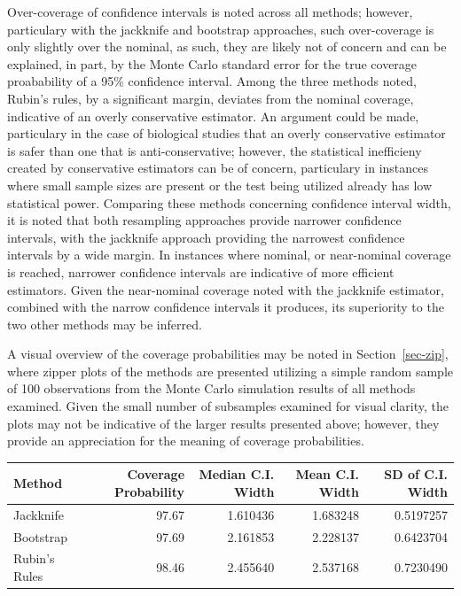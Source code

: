 \documentclass[
  letterpaper,
  DIV=11,
  numbers=noendperiod]{scrreprt}
\begin{document}
Over-coverage of confidence intervals is noted across all methods;
however, particulary with the jackknife and bootstrap approaches, such
over-coverage is only slightly over the nominal, as such, they are
likely not of concern and can be explained, in part, by the Monte Carlo
standard error for the true coverage proabability of a 95\% confidence
interval. Among the three methods noted, Rubin's rules, by a significant
margin, deviates from the nominal coverage, indicative of an overly
conservative estimator. An argument could be made, particulary in the
case of biological studies that an overly conservative estimator is
safer than one that is anti-conservative; however, the statistical
inefficieny created by conservative estimators can be of concern,
particulary in instances where small sample sizes are present or the
test being utilized already has low statistical power. Comparing these
methods concerning confidence interval width, it is noted that both
resampling approaches provide narrower confidence intervals, with the
jackknife approach providing the narrowest confidence intervals by a
wide margin. In instances where nominal, or near-nominal coverage is
reached, narrower confidence intervals are indicative of more efficient
estimators. Given the near-nominal coverage noted with the jackknife
estimator, combined with the narrow confidence intervals it produces,
its superiority to the two other methods may be inferred.

A visual overview of the coverage probabilities may be noted in
Section~\ref{sec-zip}, where zipper plots of the methods are presented
utilizing a simple random sample of 100 observations from the Monte
Carlo simulation results of all methods examined. Given the small number
of subsamples examined for visual clarity, the plots may not be
indicative of the larger results presented above; however, they provide
an appreciation for the meaning of coverage probabilities.

\begin{tabular}{lrrrr}
\toprule
Method & Coverage Probability & Median C.I. Width & Mean C.I. Width & SD of C.I. Width\\
\midrule
Jackknife & 97.67 & 1.610436 & 1.683248 & 0.5197257\\
Bootstrap & 97.69 & 2.161853 & 2.228137 & 0.6423704\\
Rubin's Rules & 98.46 & 2.455640 & 2.537168 & 0.7230490\\
\bottomrule
\end{tabular}
\end{document}

